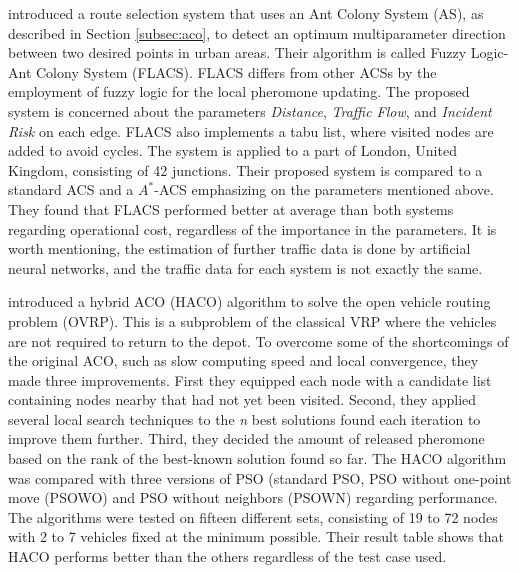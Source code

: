 \citet{salehinejad10} introduced a route selection system that uses an Ant Colony System (AS), as described in Section \vref{subsec:aco}, to detect an optimum multiparameter direction between two desired points in urban areas. Their algorithm is called Fuzzy Logic-Ant Colony System (FLACS). FLACS differs from other ACSs by the employment of fuzzy logic for the local pheromone updating. The proposed system is concerned about the parameters \textit{Distance}, \textit{Traffic Flow}, and \textit{Incident Risk} on each edge. FLACS also implements a tabu list, where visited nodes are added to avoid cycles. The system is applied to a part of London, United Kingdom, consisting of 42 junctions. Their proposed system is compared to a standard ACS and a $A^*$-ACS emphasizing on the parameters mentioned above. They found that FLACS performed better at average than both systems regarding operational cost, regardless of the importance in the parameters. It is worth mentioning, the estimation of further traffic data is done by artificial neural networks, and the traffic data for each system is not exactly the same.

\citet{sedighpour14} introduced a hybrid ACO (HACO) algorithm to solve the open vehicle routing problem (OVRP). This is a subproblem of the classical VRP where the vehicles are not required to return to the depot. To overcome some of the shortcomings of the original ACO, such as slow computing speed and local convergence, they made three improvements. First they equipped each node with a candidate list containing nodes nearby that had not yet been visited. Second,  they applied several local search techniques to the \textit{n} best solutions found each iteration to improve them further. Third, they decided the amount of released pheromone based on the rank of the best-known solution found so far. The HACO algorithm was compared with three versions of PSO (standard PSO, PSO without one-point move (PSOWO) and PSO without neighbors (PSOWN) regarding performance. The algorithms were tested on fifteen different sets, consisting of 19 to 72 nodes with 2 to 7 vehicles fixed at the minimum possible. Their result table shows that HACO performs better than the others regardless of the test case used.

